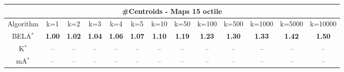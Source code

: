 \begin{tabular}{c|cccccccccccc}\toprule
\multicolumn{13}{c}{#Centroids - Maps 15 octile}\\ \midrule
Algorithm & k=1 & k=2 & k=3 & k=4 & k=5 & k=10 & k=50 & k=100 & k=500 & k=1000 & k=5000 & k=10000 \\ \midrule
BELA$^*$ & \textbf{1.00} & \textbf{1.02} & \textbf{1.04} & \textbf{1.06} & \textbf{1.07} & \textbf{1.10} & \textbf{1.19} & \textbf{1.23} & \textbf{1.30} & \textbf{1.33} & \textbf{1.42} & \textbf{1.50} \\
K$^*$ & -- & -- & -- & -- & -- & -- & -- & -- & -- & -- & -- & -- \\
mA$^*$ & -- & -- & -- & -- & -- & -- & -- & -- & -- & -- & -- & -- \\ \bottomrule 
\end{tabular}

